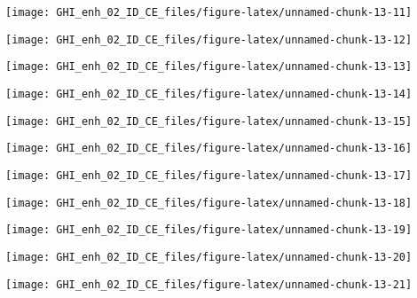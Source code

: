 \documentclass[
  10pt,
  a4paper,oneside]{article}
\begin{document}
\begin{center}\texttt{[image: GHI\_enh\_02\_ID\_CE\_files/figure-latex/unnamed-chunk-13-11]} \end{center}

\begin{center}\texttt{[image: GHI\_enh\_02\_ID\_CE\_files/figure-latex/unnamed-chunk-13-12]} \end{center}

\begin{center}\texttt{[image: GHI\_enh\_02\_ID\_CE\_files/figure-latex/unnamed-chunk-13-13]} \end{center}

\begin{center}\texttt{[image: GHI\_enh\_02\_ID\_CE\_files/figure-latex/unnamed-chunk-13-14]} \end{center}

\begin{center}\texttt{[image: GHI\_enh\_02\_ID\_CE\_files/figure-latex/unnamed-chunk-13-15]} \end{center}

\begin{center}\texttt{[image: GHI\_enh\_02\_ID\_CE\_files/figure-latex/unnamed-chunk-13-16]} \end{center}

\begin{center}\texttt{[image: GHI\_enh\_02\_ID\_CE\_files/figure-latex/unnamed-chunk-13-17]} \end{center}

\begin{center}\texttt{[image: GHI\_enh\_02\_ID\_CE\_files/figure-latex/unnamed-chunk-13-18]} \end{center}

\begin{center}\texttt{[image: GHI\_enh\_02\_ID\_CE\_files/figure-latex/unnamed-chunk-13-19]} \end{center}

\begin{center}\texttt{[image: GHI\_enh\_02\_ID\_CE\_files/figure-latex/unnamed-chunk-13-20]} \end{center}

\begin{center}\texttt{[image: GHI\_enh\_02\_ID\_CE\_files/figure-latex/unnamed-chunk-13-21]} \end{center}
\end{document}
